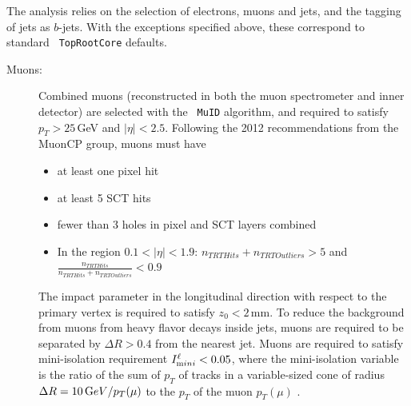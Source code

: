 The analysis relies on the selection of electrons, muons and jets, and
the tagging of jets as $b$-jets. With the exceptions specified above, these correspond to standard \texttt{ TopRootCore} defaults.
\begin{description}
\item[Muons:] Combined muons (reconstructed in both the muon spectrometer
and inner detector) are selected with the \texttt{ MuID} algorithm, and 
required to satisfy $p_T>25$\,GeV and $|\eta|<2.5$.  Following the 2012 recommendations from the MuonCP group, muons must have
\begin{itemize}
\item at least one pixel hit
\item at least 5 SCT hits
\item fewer than 3 holes in pixel and SCT layers combined
\item In the region $0.1 < |\eta| < 1.9 $: $n_{TRT Hits} + n_{TRT Outliers} > 5$ and $\frac{n_{TRT Hits}}{n_{TRT Hits} + n_{TRT Outliers}} < 0.9$
\end{itemize}

The impact parameter
in the longitudinal direction with respect to the primary vertex is
required to satisfy $z_0<2$\,mm.  To reduce the background from
muons from heavy flavor decays inside jets, muons are required to be
separated by $\Delta R>0.4$ from the nearest jet. Muons are required to satisfy 
mini-isolation requirement $I^\ell_{\textrm mini}<0.05$, where
the mini-isolation variable is the ratio of the sum of $p_T$ of tracks
in a variable-sized cone of radius $\Delta R=10\,{\textrm GeV}/p_T(\mu)$ to the $p_T$ of the muon $p_T(\mu)$ \cite{topreco}. %


\end{description}
